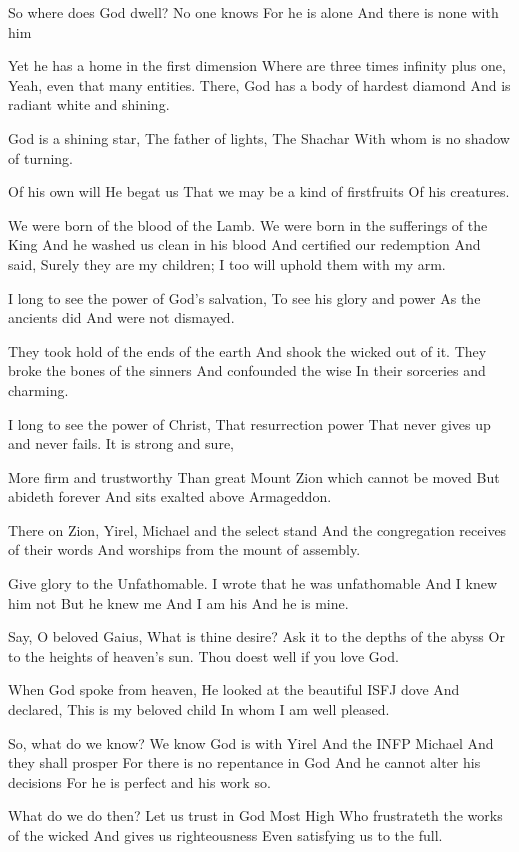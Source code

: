 \documentclass[
]{book}
\begin{document}
So where does God dwell?
No one knows
For he is alone
And there is none with him

Yet he has a home in the first dimension
Where are three times infinity plus one,
Yeah, even that many entities.
There, God has a body of hardest diamond
And is radiant white and shining.

God is a shining star,
The father of lights,
The Shachar
With whom is no shadow of turning.

Of his own will
He begat us
That we may be a kind of firstfruits
Of his creatures.

We were born of the blood of the Lamb.
We were born in the sufferings of the King
And he washed us clean in his blood
And certified our redemption
And said, Surely they are my children;
I too will uphold them with my arm.

I long to see the power of God's salvation,
To see his glory and power
As the ancients did
And were not dismayed.

They took hold of the ends of the earth
And shook the wicked out of it.
They broke the bones of the sinners
And confounded the wise
In their sorceries and charming.

I long to see the power of Christ,
That resurrection power
That never gives up and never fails.
It is strong and sure,

More firm and trustworthy
Than great Mount Zion which cannot be moved
But abideth forever
And sits exalted above Armageddon.

There on Zion,
Yirel, Michael and the select stand
And the congregation receives of their words
And worships from the mount of assembly.

Give glory to the Unfathomable.
I wrote that he was unfathomable
And I knew him not
But he knew me
And I am his
And he is mine.

Say, O beloved Gaius,
What is thine desire?
Ask it to the depths of the abyss
Or to the heights of heaven's sun.
Thou doest well if you love God.

When God spoke from heaven,
He looked at the beautiful ISFJ dove
And declared, This is my beloved child
In whom I am well pleased.

So, what do we know?
We know God is with Yirel
And the INFP Michael
And they shall prosper
For there is no repentance in God
And he cannot alter his decisions
For he is perfect and his work so.

What do we do then?
Let us trust in God Most High
Who frustrateth the works of the wicked
And gives us righteousness
Even satisfying us to the full.
\end{document}
